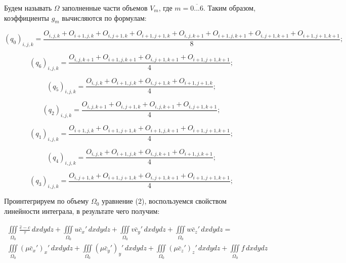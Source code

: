 \documentclass[12pt]{article}
\begin{document}
Будем называть $\Omega$ заполненные части объемов $V_m$, где $m=\overline{0...6}$. 
Таким образом, коэффициенты $g_m$ вычисляются по формулам:

\begin{equation*}
(q_0)_{i,j,k}=\frac{O_{i,j,k}+O_{i+1,j,k}+O_{i,j+1,k}+O_{i+1,j+1,k}+O_{i,j,k+1}+O_{i+1,j,k+1}+O_{i,j+1,k+1}+O_{i+1,j+1,k+1}}{8};
\end{equation*}

\begin{equation*}
 (q_6)_{i,j,k}=\frac{O_{i,j,k+1}+O_{i+1,j,k+1}+O_{i,j+1,k+1}+O_{i+1,j+1,k+1}}{4};
\end{equation*}

\begin{equation*}
(q_5)_{i,j,k}=\frac{O_{i,j,k}+O_{i+1,j,k}+O_{i,j+1,k}+O_{i+1,j+1,k}}{4};
\end{equation*}

\begin{equation*}
(q_2)_{i,j,k}=\frac{O_{i,j,k+1}+O_{i,j+1,k}+O_{i,j,k+1}+O_{i,j+1,k+1}}{4};
\end{equation*}

\begin{equation*}
(q_1)_{i,j,k}=\frac{O_{i+1,j,k}+O_{i+1,j+1,k}+O_{i+1,j,k+1}+O_{i+1,j+1,k+1}}{4};
\end{equation*}

\begin{equation*}
(q_4)_{i,j,k}=\frac{O_{i,j,k}+O_{i+1,j,k}+O_{i,j,k+1}+O_{i+1,j,k+1}}{4};
\end{equation*}

\begin{equation*}
(q_3)_{i,j,k}=\frac{O_{i,j+1,k}+O_{i+1,j+1,k}+O_{i,j+1,k+1}+O_{i+1,j+1,k+1}}{4};
\end{equation*}

Проинтегрируем по объему $\Omega_0$ уравнение (2), воспользуемся свойством линейности интеграла, в результате чего получим:

\begin{multline}
\iiint\limits_{\Omega_0} \frac{\hat c - c}{\tau}\,dxdydz + \iiint\limits_{\Omega_0} u\bar{c}_x'\,dxdydz + \iiint\limits_{\Omega_0} v\bar{c}_y'\,dxdydz + \iiint\limits_{\Omega_0} w\bar{c}_z'\,dxdydz = \\
\iiint\limits_{\Omega_0} (\mu\bar{c}_x')_x'\,dxdydz + \iiint\limits_{\Omega_0} (\mu\bar{c}_y')_y'\,dxdydz + \iiint\limits_{\Omega_0} (\mu\bar{c}_z')_z'\,dxdydz + \iiint\limits_{\Omega_0} f\,dxdydz  
\end{multline}
\end{document}
